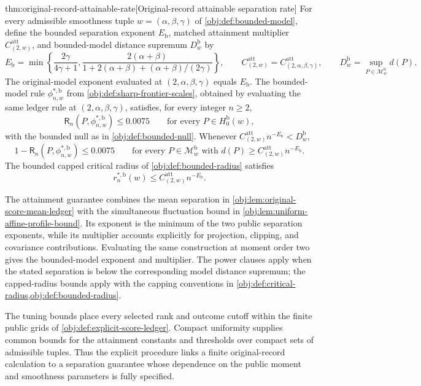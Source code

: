 \begin{theoremv}{thm:original-record-attainable-rate}[Original-record attainable separation rate]
For every admissible smoothness tuple \(w=(\alpha,\beta,\gamma)\) of \cref{obj:def:bounded-model}, define the bounded separation exponent \(E_{\mathrm b}\), matched attainment multiplier \(C^{\mathrm{att}}_{(2,w)}\), and bounded-model distance supremum \(D_w^{\mathrm b}\) by
\[
E_{\mathrm b}
=\min\left\{\frac{2\gamma}{4\gamma+1},
\frac{2(\alpha+\beta)}
{1+2(\alpha+\beta)+(\alpha+\beta)/(2\gamma)}\right\},
\qquad
C^{\mathrm{att}}_{(2,w)}
=C^{\mathrm{att}}_{(2,\alpha,\beta,\gamma)},
\qquad
D_w^{\mathrm b}=\sup_{P\in\mathcal M^{\mathrm b}_w}d(P).
\]
The original-model exponent evaluated at \((2,\alpha,\beta,\gamma)\) equals \(E_{\mathrm b}\). The bounded-model rule \(\phi^{*,\mathrm b}_{n,w}\) from \cref{obj:def:sharp-frontier-scales}, obtained by evaluating the same ledger rule at \((2,\alpha,\beta,\gamma)\), satisfies, for every integer \(n\ge2\),
\[
\mathsf R_n(P,\phi^{*,\mathrm b}_{n,w})\le0.0075
\qquad\text{for every }P\in H_0^{\mathrm b}(w),
\]
with the bounded null as in \cref{obj:def:bounded-null}. Whenever
\(C^{\mathrm{att}}_{(2,w)}n^{-E_{\mathrm b}}<D_w^{\mathrm b}\),
\[
1-\mathsf R_n(P,\phi^{*,\mathrm b}_{n,w})\le0.0075
\qquad
\text{for every }P\in\mathcal M^{\mathrm b}_w
\text{ with }d(P)\ge C^{\mathrm{att}}_{(2,w)}n^{-E_{\mathrm b}}.
\]
The bounded capped critical radius of \cref{obj:def:bounded-radius} satisfies
\[
r_n^{*,\mathrm b}(w)
\le C^{\mathrm{att}}_{(2,w)}n^{-E_{\mathrm b}}.
\]
\end{theoremv}

The attainment guarantee combines the mean separation in \cref{obj:lem:original-score-mean-ledger} with the simultaneous fluctuation bound in \cref{obj:lem:uniform-affine-profile-bound}. Its exponent is the minimum of the two public separation exponents, while its multiplier accounts explicitly for projection, clipping, and covariance contributions. Evaluating the same construction at moment order two gives the bounded-model exponent and multiplier. The power clauses apply when the stated separation is below the corresponding model distance supremum; the capped-radius bounds apply with the capping conventions in \cref{obj:def:critical-radius,obj:def:bounded-radius}.

The tuning bounds place every selected rank and outcome cutoff within the finite public grids of \cref{obj:def:explicit-score-ledger}. Compact uniformity supplies common bounds for the attainment constants and thresholds over compact sets of admissible tuples. Thus the explicit procedure links a finite original-record calculation to a separation guarantee whose dependence on the public moment and smoothness parameters is fully specified.
